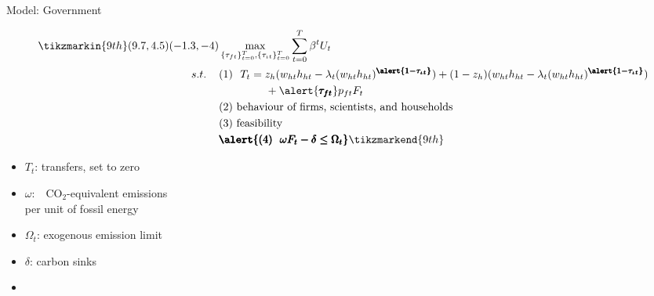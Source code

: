\documentclass[11pt,aspectratio=169]{beamer}
\begin{document}
\addtocounter{framenumber}{-1}
\begin{frame}{Model: Government}
\begin{minipage}[t!]{1\textwidth}
	\begin{align*}
	\tikzmarkin{9th}(9.7,4.5)(-1.3,-4)
&\max_{\{\tau_{ft}\}_{t=0}^{T}, \{\tau_{\iota t}\}_{t=0}^{T}} \sum_{t=0}^{T}\beta^t U_{t}\\
s.t. \hspace{4mm}
&(1)\ \ T_t = z_h(w_{ht}h_{ht}-\lambda_t(w_{ht}h_{ht})^{\pmb{\alert{1-\tau_{\iota t}}}})+(1-z_h)(w_{ht}h_{ht}-\lambda_t(w_{ht}h_{ht})^{\pmb{\alert{1-\tau_{\iota t}}}})\\ & \hspace{15mm }+\alert{\pmb{\tau_{ft}}}p_{ft}F_{t}\\
& (2)\ \text{behaviour of firms, scientists, and households}\\
& (3)\ \text{feasibility} \\
&\pmb{\alert{
(4)\ \  \omega F_t-\delta \leq\Omega_t }
}	\tikzmarkend{9th}
	\end{align*}
\end{minipage}

\small
\vspace{-3mm}
\begin{minipage}[t!]{0.4\textwidth}
\vspace{7mm}
\begin{itemize}
	\item[] $T_t$: transfers, set to zero  \vspace{0mm}
	\item[] $\omega$:\ \ CO$_2$-equivalent emissions \\ \hspace{4mm} per unit of fossil energy
\end{itemize}
\end{minipage}
\begin{minipage}[t!]{0.4\textwidth}
\vspace{8mm}
\begin{itemize}
	\item[] $\Omega_{t}$: exogenous emission limit
	\vspace{0mm}	
		\item[] $\delta$: carbon sinks\vspace{-2mm}
		\item[] 
\end{itemize}
\end{minipage}

\end{frame}
\hypertarget{calback}{}
\end{document}

